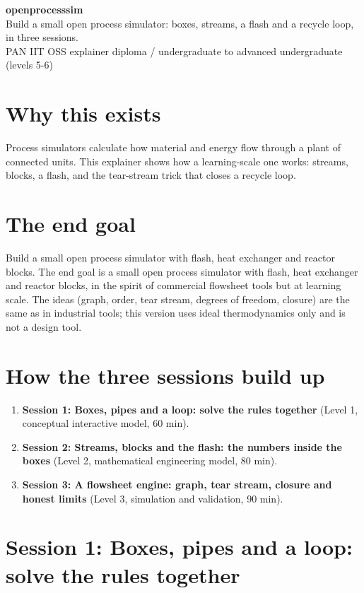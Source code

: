 \documentclass[11pt,a4paper]{article}
\begin{document}
\begin{center}{\LARGE\bfseries openprocesssim}\\[0.4em]{\large Build a small open process simulator: boxes, streams, a flash and a recycle loop, in three sessions.}\\[0.2em]\small PAN IIT OSS explainer \textbullet{} diploma / undergraduate to advanced undergraduate (levels 5-6)\end{center}

\section*{Why this exists}
Process simulators calculate how material and energy flow through a plant of connected units. This explainer shows how a learning-scale one works: streams, blocks, a flash, and the tear-stream trick that closes a recycle loop.

\section*{The end goal}
Build a small open process simulator with flash, heat exchanger and reactor blocks. The end goal is a small open process simulator with flash, heat exchanger and reactor blocks, in the spirit of commercial flowsheet tools but at learning scale. The ideas (graph, order, tear stream, degrees of freedom, closure) are the same as in industrial tools; this version uses ideal thermodynamics only and is not a design tool.

\section*{How the three sessions build up}
\begin{enumerate}[nosep]
\item \textbf{Session 1: Boxes, pipes and a loop: solve the rules together} (Level 1, conceptual interactive model, 60 min).
\item \textbf{Session 2: Streams, blocks and the flash: the numbers inside the boxes} (Level 2, mathematical engineering model, 80 min).
\item \textbf{Session 3: A flowsheet engine: graph, tear stream, closure and honest limits} (Level 3, simulation and validation, 90 min).
\end{enumerate}

\section{Session 1: Boxes, pipes and a loop: solve the rules together}
\end{document}
